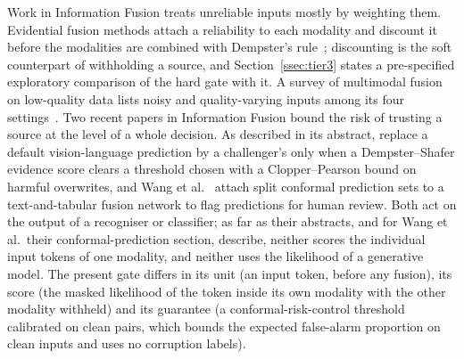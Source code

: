 Work in Information Fusion treats unreliable inputs mostly by weighting them.
Evidential fusion methods attach a reliability to each modality and discount it before the modalities are combined with
Dempster's rule~\citep{shao2024ddef,huang2025evidential}; discounting is the soft counterpart of withholding a source, and
Section~\ref{ssec:tier3} states a pre-specified exploratory comparison of the hard gate with it.
A survey of multimodal fusion on low-quality data lists noisy and quality-varying inputs among its four settings~\citep{zhang2026lowquality}.
Two recent papers in Information Fusion bound the risk of trusting a source at the level of a whole decision.
As described in its abstract, \citet{zhou2027burden} replace a default vision-language prediction by a challenger's
only when a Dempster--Shafer evidence score clears a threshold chosen with a Clopper--Pearson bound on harmful overwrites, and Wang
et al.~\citep{wang2025multistage} attach split conformal prediction sets to a text-and-tabular fusion network to flag predictions
for human review.
Both act on the output of a recogniser or classifier; as far as their abstracts, and for Wang et al.\ their conformal-prediction
section, describe, neither scores the individual input tokens of one modality, and neither uses the likelihood of a generative
model.
The present gate differs in its unit (an input token, before any fusion), its score (the masked likelihood of the token inside its
own modality with the other modality withheld) and its guarantee (a conformal-risk-control threshold calibrated on clean pairs,
which bounds the expected false-alarm proportion on clean inputs and uses no corruption labels).
